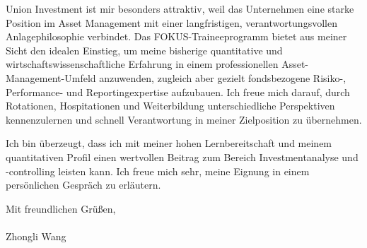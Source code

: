 \documentclass[11pt]{article}
\begin{document}
Union Investment ist mir besonders attraktiv, weil das Unternehmen eine starke Position im Asset Management mit einer langfristigen, verantwortungsvollen Anlagephilosophie verbindet. Das FOKUS-Traineeprogramm bietet aus meiner Sicht den idealen Einstieg, um meine bisherige quantitative und wirtschaftswissenschaftliche Erfahrung in einem professionellen Asset-Management-Umfeld anzuwenden, zugleich aber gezielt fondsbezogene Risiko-, Performance- und Reportingexpertise aufzubauen. Ich freue mich darauf, durch Rotationen, Hospitationen und Weiterbildung unterschiedliche Perspektiven kennenzulernen und schnell Verantwortung in meiner Zielposition zu übernehmen.

Ich bin überzeugt, dass ich mit meiner hohen Lernbereitschaft und meinem quantitativen Profil einen wertvollen Beitrag zum Bereich Investmentanalyse und -controlling leisten kann. 
Ich freue mich sehr, meine Eignung in einem persönlichen Gespräch zu erläutern.
\vspace{0.15cm}

\noindent Mit freundlichen Grü\ss{}en, \\
\vspace{1mm}\\
\noindent Zhongli Wang
\end{document}
